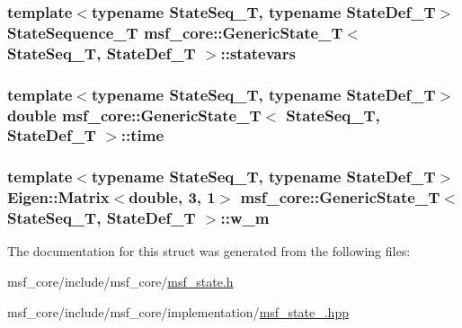 \hypertarget{structmsf__core_1_1GenericState__T_acb07cfa8c01da7ea7527ebd78710f00a}{
\subsubsection[{statevars}]{\setlength{\rightskip}{0pt plus 5cm}template$<$typename State\-Seq\-\_\-\-T, typename State\-Def\-\_\-\-T$>$ {\bf State\-Sequence\-\_\-\-T} {\bf msf\-\_\-core\-::\-Generic\-State\-\_\-\-T}$<$ State\-Seq\-\_\-\-T, State\-Def\-\_\-\-T $>$\-::statevars}}\label{structmsf__core_1_1GenericState__T_acb07cfa8c01da7ea7527ebd78710f00a}
\hypertarget{structmsf__core_1_1GenericState__T_aff998e4562be4645e60dfdb668870119}{
\subsubsection[{time}]{\setlength{\rightskip}{0pt plus 5cm}template$<$typename State\-Seq\-\_\-\-T, typename State\-Def\-\_\-\-T$>$ double {\bf msf\-\_\-core\-::\-Generic\-State\-\_\-\-T}$<$ State\-Seq\-\_\-\-T, State\-Def\-\_\-\-T $>$\-::time}}\label{structmsf__core_1_1GenericState__T_aff998e4562be4645e60dfdb668870119}
\hypertarget{structmsf__core_1_1GenericState__T_aa92f776680b8f2614d8069e0639e8864}{
\subsubsection[{w\-\_\-m}]{\setlength{\rightskip}{0pt plus 5cm}template$<$typename State\-Seq\-\_\-\-T, typename State\-Def\-\_\-\-T$>$ Eigen\-::\-Matrix$<$double, 3, 1$>$ {\bf msf\-\_\-core\-::\-Generic\-State\-\_\-\-T}$<$ State\-Seq\-\_\-\-T, State\-Def\-\_\-\-T $>$\-::w\-\_\-m}}\label{structmsf__core_1_1GenericState__T_aa92f776680b8f2614d8069e0639e8864}


The documentation for this struct was generated from the following files\-:\begin{DoxyCompactItemize}
\item 
msf\-\_\-core/include/msf\-\_\-core/\hyperlink{msf__state_8h}{msf\-\_\-state.\-h}\item 
msf\-\_\-core/include/msf\-\_\-core/implementation/\hyperlink{msf__state___8hpp}{msf\-\_\-state\-\_\-.\-hpp}\end{DoxyCompactItemize}
